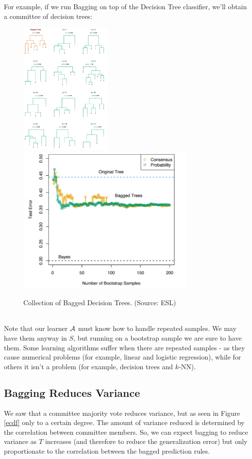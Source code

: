 For example, if we run Bagging on top of the Decision Tree classifier, we'll obtain a committee of decision trees: 
\begin{figure}[h!] %
	\centering
	\includegraphics[width=1.8in]{chapters/ensemble.methods/figures/many_trees.png}
		\includegraphics[width=3.5in]{chapters/ensemble.methods/figures/bagging.png}
	\caption{Collection of Bagged Decision Trees. (Source: ESL)}
	\label{bagging_sim}
\end{figure}

~\\
Note that our learner $\mathcal{A}$ must know how to handle repeated samples. We may have them anyway in $S$, but running on a bootstrap sample we are sure to have them. Some
learning algorithms suffer when there are repeated samples - as they cause numerical problems (for example, linear and logistic regression), while for others it isn't a problem (for example, decision trees and $k$-NN).

\subsection{Bagging Reduces Variance}
We saw that a committee majority vote reduces variance, but as seen in Figure \ref{ecdf} only to a certain degree. The amount of variance reduced is determined by the correlation between committee members. So, we can expect bagging to reduce variance as $T$ increases (and therefore to reduce the generalization error) but only proportionate to the correlation between the bagged prediction rules.

